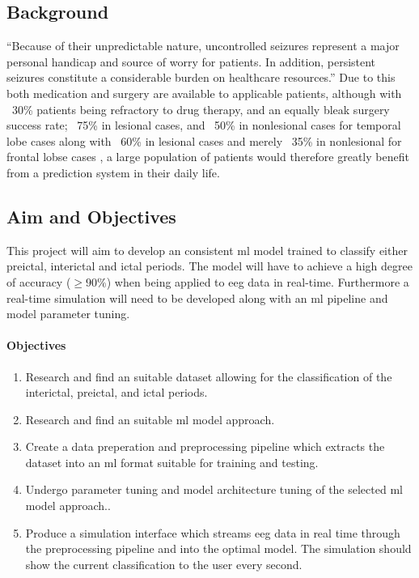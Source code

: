 \documentclass[12pt]{article}
\begin{document}
\subsection{Background}

``Because of their unpredictable nature, uncontrolled seizures represent a major personal handicap and source of worry for patients. In addition, persistent seizures constitute a considerable burden on healthcare resources.'' \cite{assi2017towards} Due to this both medication and surgery are available to applicable patients, although with ~30\% patients being refractory to drug therapy, and an equally bleak surgery success rate; ~75\% in lesional cases, and ~50\% in nonlesional cases for temporal lobe cases along with ~60\% in lesional cases and merely ~35\% in nonlesional for frontal lobse cases \cite{assi2017towards}, a large population of patients would therefore greatly benefit from a prediction system in their daily life. 

\subsection{Aim and Objectives}

This project will aim to develop an consistent \acrshort{ml} model trained to classify either preictal, interictal and ictal periods. The model will have to achieve a high degree of accuracy ($\geq90\%$) when being applied to \acrshort{eeg} data in real-time. Furthermore a real-time simulation will need to be developed along with an \acrshort{ml} pipeline and model parameter tuning. 

 
\paragraph{Objectives} \label{objectives}

\begin{enumerate}
	\item Research and find an suitable dataset allowing for the classification of the interictal, preictal, and ictal periods. 
	\item Research and find an suitable \acrshort{ml} model approach.
        \item Create a data preperation and preprocessing pipeline which extracts the dataset into an \acrshort{ml} format suitable for training and testing. 
        \item Undergo parameter tuning and model architecture tuning of the selected \acrshort{ml} model approach..
        \item Produce a simulation interface which streams \acrshort{eeg} data in real time through the preprocessing pipeline and into the optimal model. The simulation should show the current classification to the user every second.
\end{enumerate}
\end{document}
